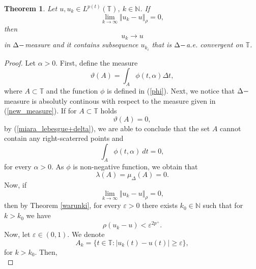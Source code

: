 \documentclass[12pt,a4paper,oneside,titlepage]{article}
\newtheorem{Twierdzenie}{Theorem}
\renewcommand{\epsilon}{\varepsilon}
\begin{document}
\begin{Twierdzenie} 
\label{podciag_pw_zbiezny}
Let $u, u_k \in L^{p(t)}(\mathbb{T}),~ k \in \mathbb{N}$. 
If 
\begin{equation}
\lim_{k \rightarrow \infty} \Vert u_k - u \Vert_{\rho}=0,
\end{equation}
then 
\begin{equation}
u_k \rightarrow u 
\end{equation}
in $\Delta \-- $measure and it contains  subsequence $u_{k_i}$ that is  $\Delta \-- $a.e. convergent on $\mathbb{T}$.
\end{Twierdzenie}
\begin{proof}
Let $\alpha>0$. First, define the measure
\begin{equation}
\label{new_measure}
\vartheta (A) = \int_{A} \phi (t, \alpha) \Delta t,
\end{equation}
where $A \subset \mathbb{T}$ and  the function $\phi$ is defined in (\ref{phi}).
Next, we notice that $\Delta \-- $measure is absolutly continous with respect to the measure given in (\ref{new_measure}). If for $A \subset \mathbb{T}$ holds
\begin{equation}
\nonumber
\vartheta(A)=0,
\end{equation}
 by (\ref{miara_lebesgue+delta}), we are able to conclude that the set $A$ cannot contain any right-scaterred points and
\begin{equation}
\nonumber
\int_{A} \phi(t,\alpha)\ dt =0,
\end{equation} 
for every $\alpha>0$. As $\phi$ is non-negative function, we obtain that 
\begin{equation}
\nonumber
\lambda(A)= \mu_{\Delta}(A) = 0 .
\end{equation}	
Now, if 
\begin{equation}
\nonumber
\lim_{k \rightarrow \infty} \Vert u_k - u \Vert_{\rho}=0,
\end{equation}
then by Theorem \ref{warunki}, for every $\epsilon>0$ there exists $k_0 \in \mathbb{N}$ such that for $k > k_0$ we have
\begin{equation} 
\nonumber
 \rho(u_k-u)< \epsilon^{2p^+}.
\end{equation}
Now, let $\epsilon \in (0,1)$. We denote
\begin{equation}
\nonumber
 A_{k}= \lbrace t \in \mathbb{T} : \vert u_k (t) - u(t) \vert \geq \epsilon \rbrace,
\end{equation} 
 for $k >k_0$. Then, 
\begin{equation}
\nonumber

\end{equation}
\end{proof}
\end{document}
